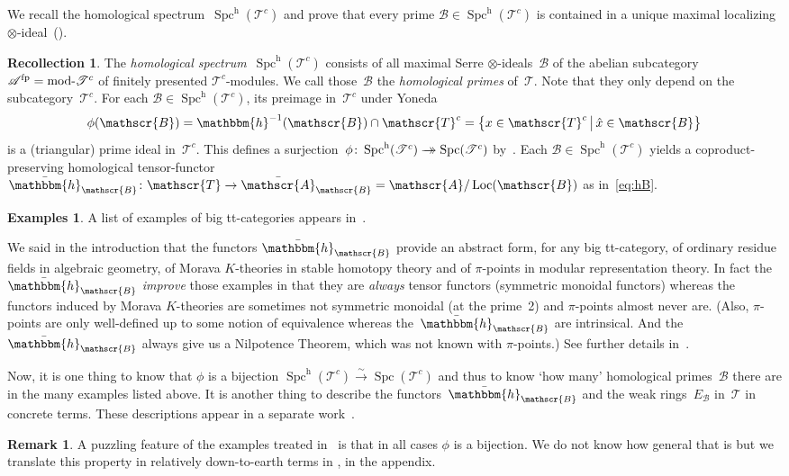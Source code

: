 \documentclass[JEP,XML,SOM,Unicode]{cedram}
\newcommand{\onto}{\mathchoice{\to\hspace*{-5mm}\to}{\to\hspace*{-2.85mm}\to}{\to\hspace*{-3mm}\to}{\to\hspace*{-3mm}\to}}
\numberwithin{equation}{section}
\theoremstyle{definition}
\newtheorem{Exas}[equation]{Examples}
\newtheorem{Rem}[equation]{Remark}
\newtheorem{Rec}[equation]{Recollection}
\DeclareMathOperator{\Spc}{Spc}
\newcommand{\cat}[1]{\mathscr{#1}}
\newcommand{\inv}{^{-1}}
\newcommand{\isoto}{\overset{\sim}{\longrightarrow}}
\newcommand{\SET}[2]{\big\{#1\,\big|\,#2\big\}}
\DeclareMathOperator{\Loc}{Loc}
\DeclareMathOperator{\modname}{mod}
\newcommand{\smallh}{\mathrm{h}}
\newcommand{\AB}{\bar{\cA}_{\cB}}
\newcommand{\boneda}{\bar\yoneda}
\newcommand{\cA}{\cat{A}}
\newcommand{\cB}{\cat{B}}
\newcommand{\cT}{\cat{T}}
\newcommand{\EB}{E_{\cB}}
\newcommand{\fp}{^{\textup{fp}}}
\newcommand{\hB}{\boneda_{\cB}}
\newcommand{\modd}{\modname\text{\!-}}
\newcommand{\mT}{\modd\cat T^c}
\newcommand{\SpchT}{\Spch(\cat{T}^c)}
\newcommand{\Spch}{\Spc^{\smallh}}
\newcommand{\SpcT}{\Spc(\cat{T}^c)}
\newcommand{\tensids}{$\otimes$\nobreakdash-ideals}
\newcommand{\tensid}{$\otimes$\nobreakdash-ideal}
\newcommand{\yoneda}{\mathbbm{h}}
\begin{document}
We recall the homological spectrum~$\SpchT$ and prove that every prime $\cB\in\SpchT$ is contained in a unique maximal localizing \tensid\ ().

\begin{Rec}
\label{Rec:Spch}
The \emph{homological spectrum}~$\SpchT$ consists of all maximal Serre \tensids\ $\cB$ of the abelian subcategory~$\cA\fp=\mT$ of finitely presented $\cT^c$\nobreakdash-modules. We call those~$\cB$ the \emph{homological primes} of~$\cT$. Note that they only depend on the subcategory~$\cT^c$. For each $\cB\in\SpchT$, its preimage in~$\cT^c$ under Yoneda
\[
\phi(\cB)=\yoneda\inv(\cB)\cap \cT^c=\SET{x\in\cT^c}{\hat x\in\cB}
\]
is a (triangular) prime ideal in~$\cT^c$. This defines a surjection~$\phi\colon\SpchT\onto \SpcT$ by~\cite[Cor.\,3.9]{Balmer20a}. Each $\cB\in\SpchT$ yields a coproduct-preserving homological tensor-functor $\hB\colon \cT\to \AB=\cA/\Loc(\cB)$ as in~\eqref{eq:hB}.
\end{Rec}

\begin{Exas}
A list of examples of big tt-categories appears in~\cite[\S1.2]{HoveyPalmieriStrickland97}.

We said in the introduction that the functors $\hB$ provide an abstract form, for any big tt-category, of ordinary residue fields in algebraic geometry, of Morava $K$\nobreakdash-theories in stable homotopy theory and of $\pi$-points in modular representation theory. In fact the $\hB$ \emph{improve} those examples in that they are \emph{always} tensor functors (\ie symmetric monoidal functors) whereas the functors induced by Morava $K$-theories are sometimes not symmetric monoidal (at the prime~2) and $\pi$-points almost never are. (Also, $\pi$\nobreakdash-points are only well-defined up to some notion of equivalence whereas the~$\hB$ are intrinsical. And the $\hB$ always give us a Nilpotence Theorem, which was not known with $\pi$-points.) See further details in~\cite[\S5]{Balmer20a}.

Now, it is one thing to know that $\phi$ is a bijection $\SpchT\isoto \SpcT$ and thus to know `how many' homological primes~$\cB$ there are in the many examples listed above. It is another thing to describe the functors~$\hB$ and the weak rings~$\EB$ in~$\cT$ in concrete terms. These descriptions appear in a separate work~\cite{BalmerCameron20pp}.
\end{Exas}

\begin{Rem}
A puzzling feature of the examples treated in~\cite{Balmer20a} is that in all cases $\phi$ is a bijection. We do not know how general that is but we translate this property in relatively down-to-earth terms in , in the appendix.
\end{Rem}
\end{document}
